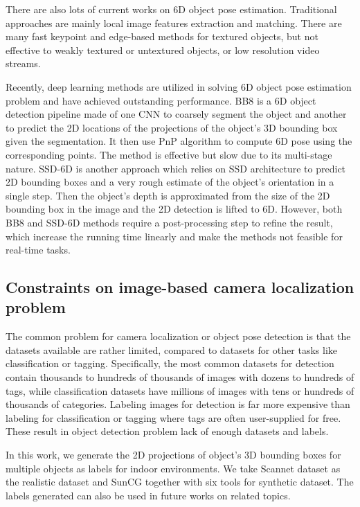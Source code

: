 There are also lots of current works on 6D object pose estimation. Traditional approaches are mainly local image features extraction and matching. There are many fast keypoint and edge-based methods for textured objects, but not effective to weakly textured or untextured objects, or low resolution video streams.

Recently, deep learning methods are utilized in solving 6D object pose estimation problem and have achieved outstanding performance. BB8 \cite{rad2017bb8} is a 6D object detection pipeline made of one CNN to coarsely segment the object and another to predict the 2D locations of the projections of the object's 3D bounding box given the segmentation. It then use PnP algorithm to compute 6D pose using the corresponding points. The method is effective but slow due to its multi-stage nature. SSD-6D \cite{kehl2017ssd} is another approach which relies on SSD architecture to predict 2D bounding boxes and a very rough estimate of the object's orientation in a single step. Then the object's depth is approximated from the size of the 2D bounding box in the image and the 2D detection is lifted to 6D. However, both BB8 and SSD-6D methods require a post-processing step to refine the result, which increase the running time linearly and make the methods not feasible for real-time tasks.

\subsection{Constraints on image-based camera localization problem}

The common problem for camera localization or object pose detection is that the datasets available are rather limited, compared to datasets for other tasks like classification or tagging. Specifically, the most common datasets for detection contain thousands to hundreds of thousands of images with dozens to hundreds of tags, while classification datasets have millions of images with tens or hundreds of thousands of categories. Labeling images for detection is far more expensive than labeling for classification or tagging where tags are often user-supplied for free. These result in object detection problem lack of enough datasets and labels.

In this work, we generate the 2D projections of object's 3D bounding boxes for multiple objects as labels for indoor environments. We take Scannet dataset as the realistic dataset and SunCG together with six tools for synthetic dataset. The labels generated can also be used in future works on related topics.


